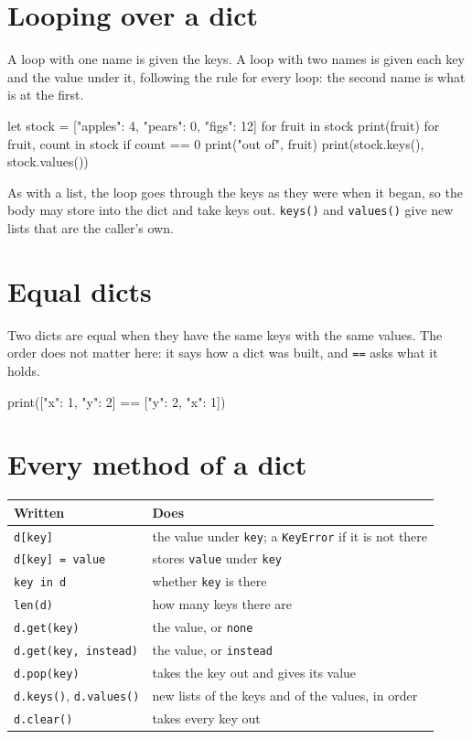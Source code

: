 \section{Looping over a dict}

A loop with one name is given the keys. A loop with two names is given
each key and the value under it, following the rule for every loop:
the second name is what is at the first.

\begin{zeno}
let stock = ["apples": 4, "pears": 0, "figs": 12]
for fruit in stock {
    print(fruit)
}
for fruit, count in stock {
    if count == 0 {
        print("out of", fruit)
    }
}
print(stock.keys(), stock.values())
\end{zeno}

As with a list, the loop goes through the keys as they were when it
began, so the body may store into the dict and take keys out.
\verb|keys()| and \verb|values()| give new lists that are the caller's
own.

\section{Equal dicts}

Two dicts are equal when they have the same keys with the same values.
The order does not matter here: it says how a dict was built, and
\verb|==| asks what it holds.

\begin{zeno}
print(["x": 1, "y": 2] == ["y": 2, "x": 1])
\end{zeno}

\section{Every method of a dict}

\begin{center}
\begin{tabular}{lP{9cm}}
\toprule
Written & Does \\
\midrule
\verb|d[key]| & the value under \verb|key|; a \verb|KeyError| if it is not there \\
\verb|d[key] = value| & stores \verb|value| under \verb|key| \\
\verb|key in d| & whether \verb|key| is there \\
\verb|len(d)| & how many keys there are \\
\verb|d.get(key)| & the value, or \verb|none| \\
\verb|d.get(key, instead)| & the value, or \verb|instead| \\
\verb|d.pop(key)| & takes the key out and gives its value \\
\verb|d.keys()|, \verb|d.values()| & new lists of the keys and of the values, in order \\
\verb|d.clear()| & takes every key out \\
\bottomrule
\end{tabular}
\end{center}


